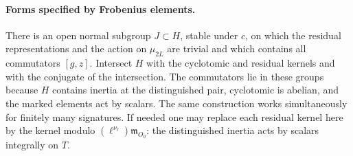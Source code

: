 \paragraph{Forms specified by Frobenius elements.}
There is an open normal subgroup \(J\subset H\), stable under
\(c\), on which the residual representations and the action
on \(\mu_{2L}\) are trivial and which contains all commutators
\([g,z]\). Intersect \(H\) with the cyclotomic and residual
kernels and with the conjugate of the intersection. The
commutators lie in these groups because \(H\) contains
inertia at the distinguished pair, cyclotomic is abelian,
and the marked elements act by scalars. The same construction
works simultaneously for finitely many signatures. If needed
one may replace each residual kernel here by the kernel modulo
\((\ell^{\nu_\ell})\mathfrak m_{O_0}\): the distinguished
inertia acts by scalars integrally on \(T\).

